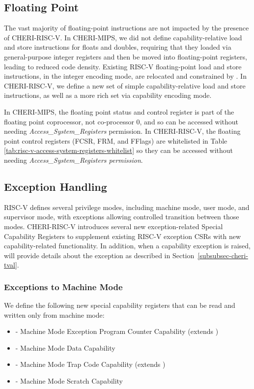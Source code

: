 \subsection{Floating Point}

The vast majority of floating-point instructions are not impacted by the
presence of CHERI-RISC-V.
In CHERI-MIPS, we did not define capability-relative load and store
instructions for floats and doubles, requiring that they loaded via
general-purpose integer registers and then be moved into floating-point registers,
leading to reduced code density.
Existing RISC-V floating-point load and store instructions, in the
integer encoding mode, are relocated and constrained by \DDC{}.
In CHERI-RISC-V, we define a new set of simple capability-relative load and
store instructions, as well as a more rich set via capability encoding mode.

In CHERI-MIPS, the floating point status and control register is part of the floating
point coprocessor, not co-processor 0, and so can be accessed without needing
\emph{Access\_System\_Registers} permission. In CHERI-RISC-V, the floating point control
registers (FCSR, FRM, and FFlags) are whitelisted in Table \ref{tab:risc-v-access-system-registers-whitelist}
so they can be accessed without needing \emph{Access\_System\_Registers permission}.

\subsection{Exception Handling}
\label{subsection:riscv:exceptionhandling}
RISC-V defines several privilege modes, including machine mode, user mode, and
supervisor mode, with exceptions allowing controlled transition between those modes.
CHERI-RISC-V introduces several new exception-related Special Capability Registers
to supplement existing RISC-V exception CSRs with new capability-related functionality.
In addition, when a capability exception is raised, \xtval{} will provide
details about the exception as described in Section~\ref{subsubsec-cheri-tval}.

\subsubsection{Exceptions to Machine Mode}
We define the following new special capability registers that can be read and
written only from machine mode:

\begin{itemize}
\item \MEPCC{} - Machine Mode Exception Program Counter Capability (extends
  \mepc{})
\item \MTDC{} - Machine Mode Data Capability
\item \MTCC{} - Machine Mode Trap Code Capability (extends \mtvec{})
\item \MScratchC{} - Machine Mode Scratch Capability
\end{itemize}

